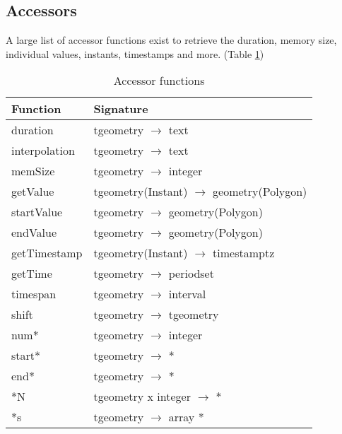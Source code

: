 \subsection{Accessors}
\label{section:accessors}

A large list of accessor functions exist to retrieve the duration, memory size, individual values, instants, timestamps and more. (Table \ref{table:accessor_funcs})

\begin{table}[h!]
    \centering
    \begin{tabularx}{\textwidth}{|l|X|}
    \hline
    \textbf{Function}   & \textbf{Signature} \\ 
    \hline
    duration            & tgeometry $\rightarrow$ text\\
    \hline
    interpolation       & tgeometry $\rightarrow$ text\\
    \hline
    memSize             & tgeometry $\rightarrow$ integer \\
    \hline
    getValue            & tgeometry(Instant) $\rightarrow$ geometry(Polygon) \\
    \hline
    startValue          & tgeometry $\rightarrow$ geometry(Polygon) \\
    \hline
    endValue            & tgeometry $\rightarrow$ geometry(Polygon) \\
    \hline
    getTimestamp        & tgeometry(Instant) $\rightarrow$ timestamptz \\
    \hline
    getTime             & tgeometry $\rightarrow$ periodset \\
    \hline
    timespan            & tgeometry $\rightarrow$ interval \\
    \hline
    shift               & tgeometry $\rightarrow$ tgeometry \\
    \hline
    num*                & tgeometry $\rightarrow$ integer \\
    \hline
    start*              & tgeometry $\rightarrow$ * \\
    \hline
    end*                & tgeometry $\rightarrow$ * \\
    \hline
    *N                  & tgeometry x integer $\rightarrow$ *\\
    \hline
    *s                  & tgeometry $\rightarrow$ array *\\
    \hline
    \end{tabularx}
    \caption{Accessor functions}
    \label{table:accessor_funcs}
\end{table}


